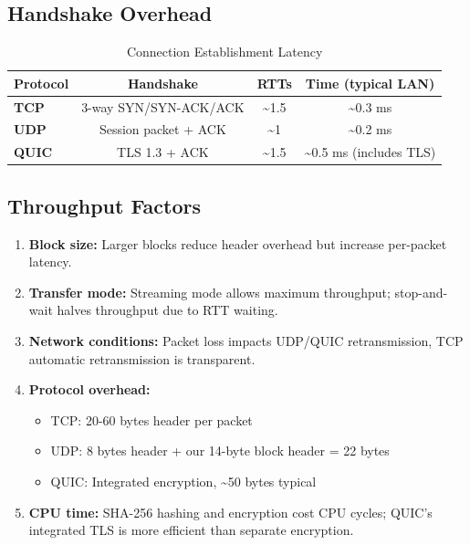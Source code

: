 \documentclass[12pt,a4paper]{article}
\begin{document}
\subsection{Handshake Overhead}

\begin{table}[H]
\centering
\caption{Connection Establishment Latency}
\begin{tabular}{|l|c|c|c|}
\hline
\textbf{Protocol} & \textbf{Handshake} & \textbf{RTTs} & \textbf{Time (typical LAN)} \\
\hline
\textbf{TCP} & 3-way SYN/SYN-ACK/ACK & \~{}1.5 & \~{}0.3 ms \\
\textbf{UDP} & Session packet + ACK & \~{}1 & \~{}0.2 ms \\
\textbf{QUIC} & TLS 1.3 + ACK & \~{}1.5 & \~{}0.5 ms (includes TLS) \\
\hline
\end{tabular}
\end{table}

\subsection{Throughput Factors}

\begin{tcolorbox}[colback=gray!5,colframe=keycolor,title=Key Performance Factors]
\begin{enumerate}
  \item \textbf{Block size:} Larger blocks reduce header overhead but increase per-packet latency.
  \item \textbf{Transfer mode:} Streaming mode allows maximum throughput; stop-and-wait halves throughput due to RTT waiting.
  \item \textbf{Network conditions:} Packet loss impacts UDP/QUIC retransmission, TCP automatic retransmission is transparent.
  \item \textbf{Protocol overhead:}
    \begin{itemize}
      \item TCP: 20-60 bytes header per packet
      \item UDP: 8 bytes header + our 14-byte block header = 22 bytes
      \item QUIC: Integrated encryption, \~{}50 bytes typical
    \end{itemize}
  \item \textbf{CPU time:} SHA-256 hashing and encryption cost CPU cycles; QUIC's integrated TLS is more efficient than separate encryption.
\end{enumerate}
\end{tcolorbox}
\end{document}
